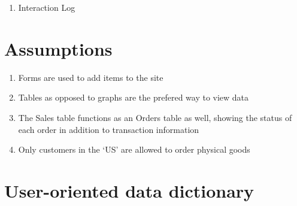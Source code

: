 \documentclass[11pt, a4paper]{report}
\begin{document}
\begin{enumerate}
\item Interaction Log
 
\end{enumerate}

\clearpage
\section{Assumptions}
\begin{enumerate}
\item Forms are used to add items to the site
\item Tables as opposed to graphs are the prefered way to view data
\item The Sales table functions as an Orders table as well, showing the status of each order in addition to transaction information
\item Only customers in the ‘US’ are allowed to order physical goods
\end{enumerate}

\clearpage
\section{User-oriented data dictionary}
\end{document}
